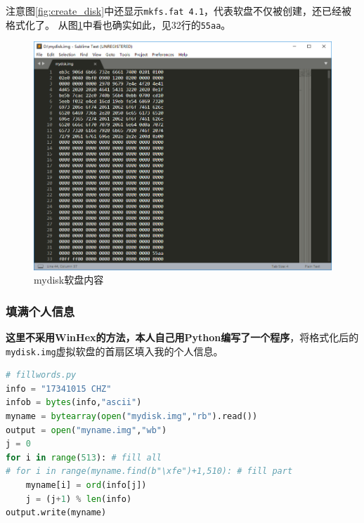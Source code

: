 \documentclass[logo,reportComp]{thesis}
\begin{document}
注意图\ref{fig:create_disk}中还显示\verb'mkfs.fat 4.1'，代表软盘不仅被创建，还已经被格式化了。
从图\ref{fig:mydisk}中看也确实如此，见32行的\verb'55aa'。

\begin{figure}[H]
\centering
\includegraphics[width=0.8\linewidth]{fig/mydisk.PNG}
\caption{mydisk软盘内容}
\label{fig:mydisk}
\end{figure}

\subsubsection{填满个人信息}
\textbf{这里不采用WinHex的方法，本人自己用Python编写了一个程序}，将格式化后的\verb'mydisk.img'虚拟软盘的首扇区填入我的个人信息。
\begin{lstlisting}[language=python]
# fillwords.py
info = "17341015 CHZ"
infob = bytes(info,"ascii")
myname = bytearray(open("mydisk.img","rb").read())
output = open("myname.img","wb")
j = 0
for i in range(513): # fill all
# for i in range(myname.find(b"\xfe")+1,510): # fill part
	myname[i] = ord(info[j])
	j = (j+1) % len(info)
output.write(myname)
\end{lstlisting}
\end{document}
